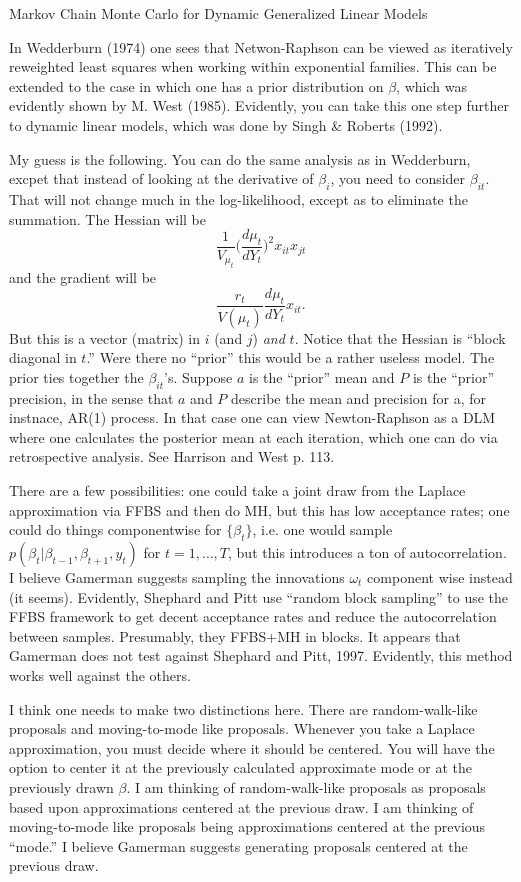 \documentclass{article}
\begin{document}
Markov Chain Monte Carlo for Dynamic Generalized Linear Models

In Wedderburn (1974) one sees that Netwon-Raphson can be viewed as iteratively
reweighted least squares when working within exponential families.  This can be
extended to the case in which one has a prior distribution on $\beta$, which was
evidently shown by M. West (1985).  Evidently, you can take this one step
further to dynamic linear models, which was done by Singh \& Roberts (1992).

My guess is the following.  You can do the same analysis as in Wedderburn,
excpet that instead of looking at the derivative of $\beta_i$, you need to
consider $\beta_{it}$.  That will not change much in the log-likelihood, except
as to eliminate the summation.  The Hessian will be
\[
\frac{1}{V_{\mu_t}} \Big( \frac{d\mu_t}{d Y_t} \Big)^2 x_{it} x_{jt} 
\]
and the gradient will be
\[
\frac{r_t}{V(\mu_t)} \frac{d \mu_t}{d Y_t} x_{it}.
\]
But this is a vector (matrix) in $i$ (and $j$) \emph{and} $t$.  Notice that the
Hessian is ``block diagonal in $t$.''  Were there no ``prior'' this would be a
rather useless model.  The prior ties together the $\beta_{it}$'s.  Suppose $a$
is the ``prior'' mean and $P$ is the ``prior'' precision, in the sense that $a$
and $P$ describe the mean and precision for a, for instnace, AR(1) process.  In
that case one can view Newton-Raphson as a DLM where one calculates the
posterior mean at each iteration, which one can do via retrospective analysis.
See Harrison and West p. 113.

There are a few possibilities: one could take a joint draw from the Laplace
approximation via FFBS and then do MH, but this has low acceptance rates; one
could do things componentwise for $\{\beta_t\}$, i.e. one would sample
$p(\beta_t | \beta_{t-1}, \beta_{t+1}, y_t)$ for $t=1, \ldots, T$, but this
introduces a ton of autocorrelation.  I believe Gamerman suggests sampling the
innovations $\omega_t$ component wise instead (it seems).  Evidently, Shephard
and Pitt use ``random block sampling'' to use the FFBS framework to get decent
acceptance rates and reduce the autocorrelation between samples.  Presumably,
they FFBS+MH in blocks.  It appears that Gamerman does not test against Shephard
and Pitt, 1997.  Evidently, this method works well against the others.

I think one needs to make two distinctions here.  There are random-walk-like
proposals and moving-to-mode like proposals.  Whenever you take a Laplace
approximation, you must decide where it should be centered.  You will have the
option to center it at the previously calculated approximate mode or at the
previously drawn $\beta$.  I am thinking of random-walk-like proposals as
proposals based upon approximations centered at the previous draw.  I am
thinking of moving-to-mode like proposals being approximations centered at the
previous ``mode.''  I believe Gamerman suggests generating proposals centered at
the previous draw.
\end{document}
